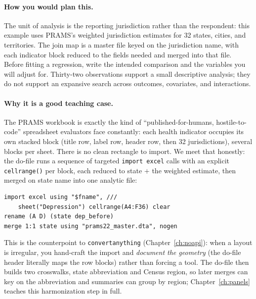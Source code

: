 \paragraph{How you would plan this.} The unit of analysis is the reporting jurisdiction rather than the respondent: this example uses PRAMS's weighted jurisdiction estimates for 32 states, cities, and territories. The join map is a master file keyed on the jurisdiction name, with each indicator block reduced to the fields needed and merged into that file. Before fitting a regression, write the intended comparison and the variables you will adjust for. Thirty-two observations support a small descriptive analysis; they do not support an expansive search across outcomes, covariates, and interactions.

\paragraph{Why it is a good teaching case.} The PRAMS workbook is exactly the kind of \enquote{published-for-humans, hostile-to-code} spreadsheet evaluators face constantly: each health indicator occupies its own stacked block (title row, label row, header row, then 32 jurisdictions), several blocks per sheet. There is no clean rectangle to import. We meet that honestly: the do-file runs a sequence of targeted \texttt{import excel} calls with an explicit \texttt{cellrange()} per block, each reduced to state $+$ the weighted estimate, then merged on state name into one analytic file:
\par
{\footnotesize
\begin{verbatim}
import excel using "$fname", ///
    sheet("Depression") cellrange(A4:F36) clear
rename (A D) (state dep_before)
merge 1:1 state using "prams22_master.dta", nogen
\end{verbatim}
}
This is the counterpoint to \texttt{convertanything} (Chapter~\ref{ch:noapi}): when a layout is irregular, you hand-craft the import and \emph{document the geometry} (the do-file header literally maps the row blocks) rather than forcing a tool. The do-file then builds two crosswalks, state abbreviation and Census region, so later merges can key on the abbreviation and summaries can group by region; Chapter~\ref{ch:panels} teaches this harmonization step in full.

